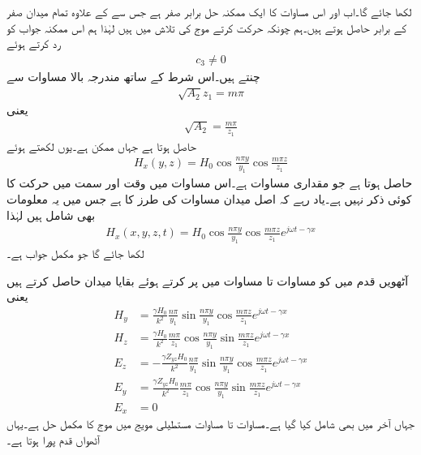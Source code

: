 لکھا جائے گا۔اب   اور اس مساوات کا ایک ممکنہ حل  برابر صفر ہے جس سے  کے علاوہ تمام میدان صفر کے برابر حاصل ہوتے ہیں۔ہم چونکہ حرکت کرتے موج کی تلاش میں ہیں لہٰذا ہم اس ممکنہ جواب کو رد کرتے ہوئے
\begin{align}
c_3 \ne 0
\end{align}
چنتے ہیں۔اس شرط کے ساتھ مندرجہ بالا مساوات سے
\begin{align}
\sqrt{A_2} z_1 = m\pi
\end{align}
یعنی
\begin{align}\label{مساوات_مویج_عمومی_حل_دوسرا_مستقل}
\sqrt{A_2}=\frac{m \pi}{z_1}
\end{align}
حاصل ہوتا ہے جہاں  ممکن ہے۔یوں  لکھتے ہوئے
\begin{align}\label{مساوات_مویج_موج_حل_ث}
H_x(y,z)=H_0 \cos \frac{n \pi y}{y_1}  \cos  \frac{m \pi z}{z_1}
\end{align}
حاصل ہوتا ہے جو مقداری مساوات ہے۔اس مساوات میں وقت  اور  سمت میں حرکت کا کوئی ذکر نہیں ہے۔یاد رہے کہ اصل میدان مساوات  کی طرز کا ہے جس میں یہ معلومات بھی شامل ہیں  لہٰذا
 \begin{align}\label{مساوات_مویج_مکمل_الف}
H_x(x,y,z,t)=H_0 \cos \frac{n \pi y}{y_1}  \cos  \frac{m \pi z}{z_1} e^{j \omega t -\gamma x}
\end{align}
لکھا جائے گا جو مکمل جواب ہے۔

آٹھویں قدم میں  کو مساوات  تا مساوات  میں پر کرتے ہوئے بقایا میدان حاصل کرتے ہیں یعنی
\begin{align}
H_y&=\frac{\gamma H_0}{k^2}\frac{n \pi}{y_1} \sin \frac{n\pi y}{y_1} \cos \frac{m \pi z}{z_1} e^{j \omega t -\gamma x} \label{مساوات_مویج_مکمل_ب}\\
H_z&=\frac{\gamma H_0}{k^2}\frac{m \pi}{z_1} \cos \frac{n\pi y}{y_1} \sin \frac{m \pi z}{z_1} e^{j \omega t -\gamma x}\label{مساوات_مویج_مکمل_پ}\\
E_z&=-\frac{\gamma  Z_{yz} H_0}{k^2}\frac{n \pi}{y_1} \sin \frac{n\pi y}{y_1} \cos \frac{m \pi z}{z_1} e^{j \omega t -\gamma x}\label{مساوات_مویج_مکمل_ت}\\
E_y&=\frac{\gamma  Z_{yz} H_0}{k^2}\frac{m \pi}{z_1} \cos \frac{n\pi y}{y_1} \sin \frac{m \pi z}{z_1} e^{j \omega t -\gamma x}\label{مساوات_مویج_مکمل_ٹ}\\
E_x&=0 \label{مساوات_مویج_مکمل_ث}
\end{align}
جہاں آخر میں  بھی شامل کیا گیا ہے۔مساوات  تا مساوات  مستطیلی مویج میں  موج کا مکمل حل ہے۔یہاں آٹھواں قدم پورا ہوتا ہے۔

